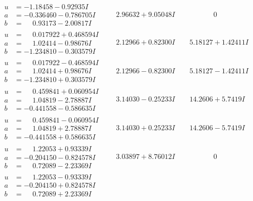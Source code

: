 \documentclass[1p]{elsarticle_modified}
\theoremstyle{definition}
\begin{document}
$$\begin{array}{c|c|c}
\begin{aligned}
u &= -1.18458 - 0.92935 I \\
a &= -0.336460 - 0.786705 I \\
b &= \phantom{-}0.93173 - 2.00817 I\end{aligned}
 & \phantom{-}2.96632 + 9.05048 I & \phantom{-0.000000 } 0 \\ \hline\begin{aligned}
u &= \phantom{-}0.017922 + 0.468594 I \\
a &= \phantom{-}1.02414 - 0.98676 I \\
b &= -1.234810 - 0.303579 I\end{aligned}
 & \phantom{-}2.12966 + 0.82300 I & \phantom{-}5.18127 + 1.42411 I \\ \hline\begin{aligned}
u &= \phantom{-}0.017922 - 0.468594 I \\
a &= \phantom{-}1.02414 + 0.98676 I \\
b &= -1.234810 + 0.303579 I\end{aligned}
 & \phantom{-}2.12966 - 0.82300 I & \phantom{-}5.18127 - 1.42411 I \\ \hline\begin{aligned}
u &= \phantom{-}0.459841 + 0.060954 I \\
a &= \phantom{-}1.04819 - 2.78887 I \\
b &= -0.441558 - 0.586635 I\end{aligned}
 & \phantom{-}3.14030 - 0.25233 I & \phantom{-}14.2606 + 5.7419 I \\ \hline\begin{aligned}
u &= \phantom{-}0.459841 - 0.060954 I \\
a &= \phantom{-}1.04819 + 2.78887 I \\
b &= -0.441558 + 0.586635 I\end{aligned}
 & \phantom{-}3.14030 + 0.25233 I & \phantom{-}14.2606 - 5.7419 I \\ \hline\begin{aligned}
u &= \phantom{-}1.22053 + 0.93339 I \\
a &= -0.204150 - 0.824578 I \\
b &= \phantom{-}0.72089 - 2.23369 I\end{aligned}
 & \phantom{-}3.03897 + 8.76012 I & \phantom{-0.000000 } 0 \\ \hline\begin{aligned}
u &= \phantom{-}1.22053 - 0.93339 I \\
a &= -0.204150 + 0.824578 I \\
b &= \phantom{-}0.72089 + 2.23369 I\end{aligned}

\end{array}$$
\end{document}
